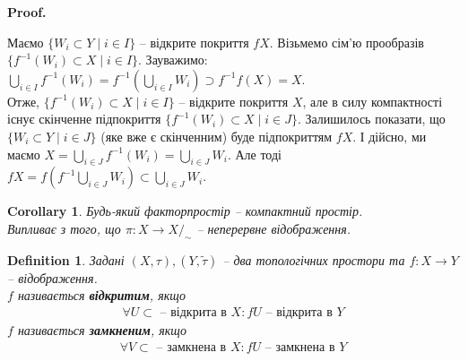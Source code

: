 \documentclass[a4paper, 10pt]{article}
\makeatletter
\theoremstyle{theoremdd}
\newtheorem{definition}[theorem]{Definition}
\newtheorem{corollary}[theorem]{Corollary}
\DeclareMathOperator{\Cl}{Cl}
\renewenvironment{proof}[1][Proof.\\]{\par
\pushQED{\hfill \qed}%
\normalfont \topsep6\p@\@plus6\p@\relax
\trivlist
\item\relax
{\bfseries
#1\@addpunct{.}}\hspace\labelsep\ignorespaces
}{%
\popQED\endtrivlist\@endpefalse
}
\makeatother
\begin{document}
\begin{proof}
Маємо $\{W_i \subset Y \mid i \in I\}$ -- відкрите покриття $fX$. Візьмемо сім'ю прообразів $\{f^{-1}(W_i) \subset X \mid i \in I\}$. Зауважимо:\\
$\displaystyle\bigcup_{i \in I} f^{-1}(W_i) = f^{-1} \left( \bigcup_{i \in I} W_i \right) \supset f^{-1} f(X) = X$.\\
Отже, $\{f^{-1}(W_i) \subset X \mid i \in I\}$ -- відкрите покриття $X$, але в силу компактності існує скінченне підпокриття $\{f^{-1}(W_i) \subset X \mid i \in J\}$. Залишилось показати, що $\{W_i \subset Y \mid i \in J\}$ (яке вже є скінченним) буде підпокриттям $fX$. І дійсно, ми маємо $X = \displaystyle\bigcup_{i \in J} f^{-1}(W_i) = \bigcup_{i \in J} W_i$. Але тоді \\ $fX = \displaystyle f\left( f^{-1} \bigcup_{i \in J} W_i \right) \subset \bigcup_{i \in J} W_i$.
\end{proof}

\iffalse
\begin{corollary}
Задано $(X,\tau)$ -- компактний простір та $f \colon X \to \mathbb{R}$ -- неперервна функція. Тоді $f$ -- обмежена та досягає найменшого та найбільшого значень (якщо $X \neq \emptyset$).
\end{corollary}

\begin{proof}
Дійсно, $X$ -- компактна, а тому за лемою, $fX$ -- компактна. Звідси з курса мат аналізу, $fX$ обмежена та замкнена (лема Гайне-Бореля). Якщо $X \neq \emptyset$, то тоді $fX$ має супремум. $\sup A \in \Cl(A)$, якщо $A \subset \mathbb{R}$ непорожня та обмежена зверху
\end{proof}
\fi

\begin{corollary}
Будь-який факторпростір -- компактний простір.\\
\textit{Випливає з того, що $\pi \colon X \to X/_\sim$ -- неперервне відображення.}
\end{corollary}

\begin{definition}
Задані $(X,\tau),(Y,\tilde{\tau})$ -- два топологічних простори та $f \colon X \to Y$ -- відображення.\\
$f$ називається \textbf{відкритим}, якщо
\begin{align*}
\forall U \subset \text{ -- відкрита в } X: fU \text{ -- відкрита в } Y
\end{align*}
$f$ називається \textbf{замкненим}, якщо
\begin{align*}
\forall V \subset \text{ -- замкнена в } X: fU \text{ -- замкнена в } Y
\end{align*}
\end{definition}
\end{document}
